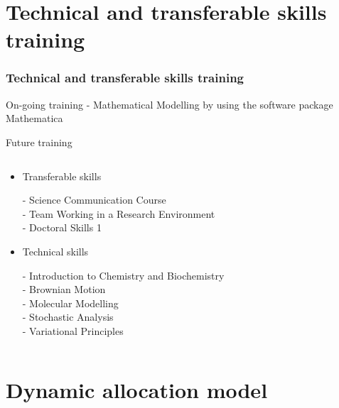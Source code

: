 \documentclass[handout]{beamer}
\begin{document}
\section{Technical and transferable skills training}
\begin{frame}
\frametitle{Technical and transferable skills training}
\begin{block}{On-going training}
  -  Mathematical Modelling by using the software package Mathematica

\end{block}

\begin{block}{Future training}
\begin{minipage}[0.2\textheight]{\textwidth}
\begin{columns}[T]
\begin{column}{0.75\textwidth}
\begin{itemize}
\item Transferable skills

 -  Science Communication Course\\
 -  Team Working in a Research Environment\\
 -  Doctoral Skills 1

\item Technical skills

 -  Introduction to Chemistry and Biochemistry\\
 -  Brownian Motion\\
 -  Molecular Modelling\\
 -  Stochastic Analysis\\
 -  Variational Principles

\end{itemize}
\end{column}

\begin{column}{0.25\textwidth}
\center{\texttt{[image: T]}}
\end{column}

\end{columns}
\end{minipage}
\end{block}
\end{frame}

\section{Dynamic allocation model}
\end{document}
